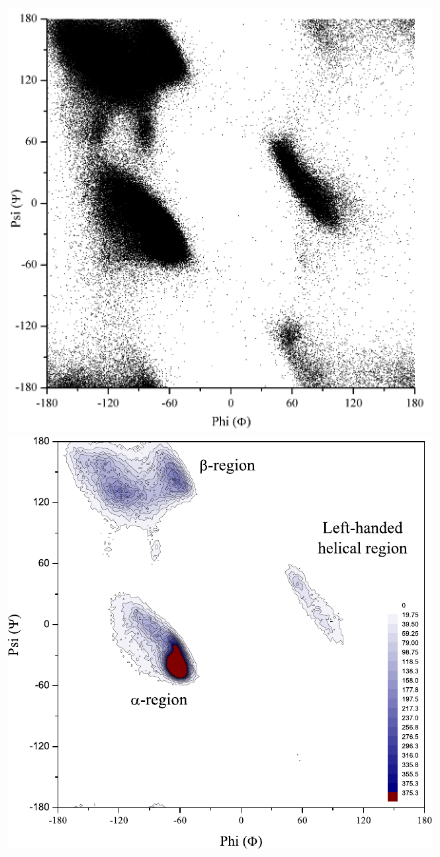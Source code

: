 \begin{figure}[hptb]
\begin{minipage}[b]{0.47\linewidth}
\centering
\includegraphics[width=1.0\textwidth]{./01-ProteinStructure/ramachandran/ram_scatter.png}
\end{minipage}
\hspace{0.5cm}
\begin{minipage}[b]{0.47\linewidth}
\centering
\includegraphics[width=1.0\textwidth]{./01-ProteinStructure/ramachandran/ram_Contour.pdf}

\end{minipage}
\end{figure}
